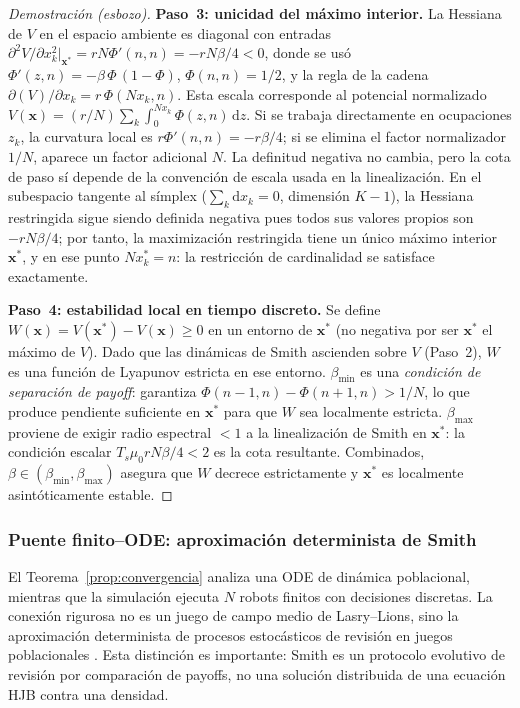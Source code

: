 \begin{proof}[Demostración (esbozo)]
\textbf{Paso~3: unicidad del máximo interior.}
La Hessiana de $V$ en el espacio ambiente es diagonal con entradas
$\partial^2 V / \partial x_k^2|_{\mathbf{x}^*} = r N\Phi'(n,n) = -rN\beta/4 < 0$,
donde se usó $\Phi'(z,n) = -\beta\,\Phi\,(1{-}\Phi)$, $\Phi(n,n) = 1/2$, y la
regla de la cadena $\partial (V)/\partial x_k = r\,\Phi(Nx_k,n)$.
Esta escala corresponde al potencial normalizado
$V(\mathbf{x})=(r/N)\sum_k\int_0^{Nx_k}\Phi(z,n)\,\mathrm{d}z$. Si se trabaja
directamente en ocupaciones $z_k$, la curvatura local es $r\Phi'(n,n)=-r\beta/4$;
si se elimina el factor normalizador $1/N$, aparece un factor adicional $N$. La
definitud negativa no cambia, pero la cota de paso sí depende de la convención de
escala usada en la linealización.
En el subespacio tangente al símplex ($\sum_k \mathrm{d}x_k = 0$, dimensión $K{-}1$),
la Hessiana restringida sigue siendo definida negativa pues todos sus valores propios
son $-rN\beta/4$; por tanto, la maximización restringida tiene un único máximo
interior $\mathbf{x}^*$, y en ese punto $Nx_k^* = n$: la restricción de cardinalidad
se satisface exactamente.

\textbf{Paso~4: estabilidad local en tiempo discreto.}
Se define $W(\mathbf{x}) = V(\mathbf{x}^*) - V(\mathbf{x}) \geq 0$ en un entorno
de $\mathbf{x}^*$ (no negativa por ser $\mathbf{x}^*$ el máximo de $V$).
Dado que las dinámicas de Smith ascienden sobre $V$ (Paso~2), $W$ es una
función de Lyapunov estricta en ese entorno.
$\beta_{\min}$ es una \emph{condición de separación de payoff}: garantiza
$\Phi(n{-}1,n)-\Phi(n{+}1,n) > 1/N$, lo que produce pendiente suficiente en $\mathbf{x}^*$
para que $W$ sea localmente estricta.
$\beta_{\max}$ proviene de exigir radio espectral $< 1$ a la linealización de Smith
en $\mathbf{x}^*$: la condición escalar $T_s\mu_0 r N\beta/4 < 2$ es la cota resultante.
Combinados, $\beta \in (\beta_{\min},\beta_{\max})$ asegura que $W$ decrece estrictamente
y $\mathbf{x}^*$ es localmente asintóticamente estable.
\end{proof}

\subsubsection{Puente finito--ODE: aproximación determinista de Smith}
\label{subsubsec:aproximacion-determinista-smith}

El Teorema~\ref{prop:convergencia} analiza una ODE de dinámica poblacional, mientras que
la simulación ejecuta $N$ robots finitos con decisiones discretas. La conexión rigurosa no
es un juego de campo medio de Lasry--Lions, sino la aproximación determinista de procesos
estocásticos de revisión en juegos poblacionales \citep{benaim2003deterministic,
sandholm2010population,kurtz1970solutions}. Esta distinción es importante: Smith es un
protocolo evolutivo de revisión por comparación de payoffs, no una solución distribuida de
una ecuación HJB contra una densidad.

